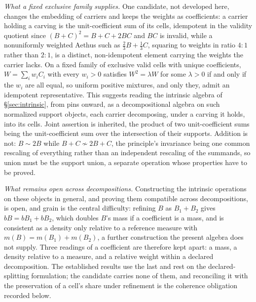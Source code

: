 \textit{What a fixed exclusive family supplies.} One candidate, not developed here, changes the embedding of carriers and keeps the weights as coefficients: a carrier holding a carving is the unit-coefficient sum of its cells, idempotent in the validity quotient since $(B + C)^{2} = B + C + 2BC$ and $BC$ is invalid, while a nonuniformly weighted Aethus such as $\tfrac23 B + \tfrac13 C$, squaring to weights in ratio $4:1$ rather than $2:1$, is a distinct, non-idempotent element carrying the weights the carrier lacks. On a fixed family of exclusive valid cells with unique coefficients, $W = \sum_i w_i C_i$ with every $w_i > 0$ satisfies $W^{2} = \lambda W$ for some $\lambda > 0$ if and only if the $w_i$ are all equal, so uniform positive mixtures, and only they, admit an idempotent representative. This suggests reading the intrinsic algebra of \S\ref{sec:intrinsic}, from pins onward, as a decompositional algebra on such normalized support objects, each carrier decomposing, under a carving it holds, into its cells. Joint assertion is inherited, the product of two unit-coefficient sums being the unit-coefficient sum over the intersection of their supports. Addition is not: $B \sim 2B$ while $B + C \not\sim 2B + C$, the principle's invariance being one common rescaling of everything rather than an independent rescaling of the summands, so union must be the support union, a separate operation whose properties have to be proved.

\textit{What remains open across decompositions.} Constructing the intrinsic operations on these objects in general, and proving them compatible across decompositions, is open, and grain is the central difficulty: refining $B$ as $B_1 + B_2$ gives $bB = bB_1 + bB_2$, which doubles $B$'s mass if a coefficient is a mass, and is consistent as a density only relative to a reference measure with $m(B) = m(B_1) + m(B_2)$, a further construction the present algebra does not supply. Three readings of a coefficient are therefore kept apart: a mass, a density relative to a measure, and a relative weight within a declared decomposition. The established results use the last and rest on the declared-splitting formulation; the candidate carries none of them, and reconciling it with the preservation of a cell's share under refinement is the coherence obligation recorded below.

